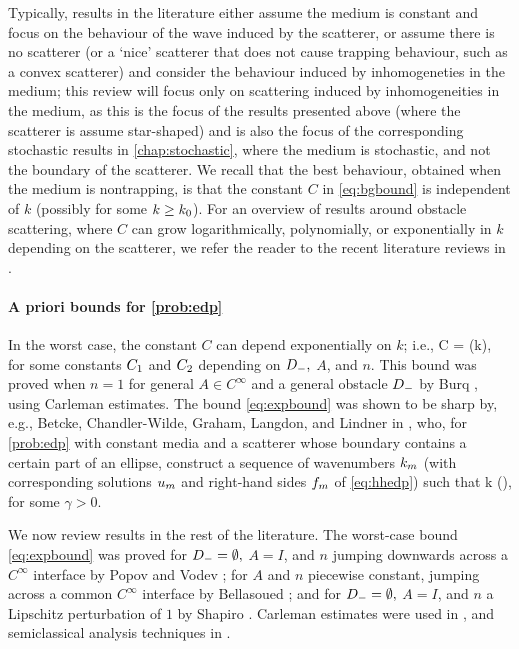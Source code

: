 Typically, results in the literature either assume the medium is constant and focus on the behaviour of the wave induced by the scatterer, or assume there is no scatterer (or a `nice' scatterer that does not cause trapping behaviour, such as a convex scatterer) and consider the behaviour induced by inhomogeneties in the medium; this review will focus only on scattering induced by inhomogeneities in the medium, as this is the focus of the results presented above (where the scatterer is assume star-shaped) and is also the focus of the corresponding stochastic results in \cref{chap:stochastic}, where the medium is stochastic, and not the boundary of the scatterer. We recall that the best behaviour, obtained when the medium is nontrapping, is that the constant $C$ in \eqref{eq:bgbound} is independent of $k$ (possibly for some $k \geq k_{0}$). For an overview of results around obstacle scattering, where $C$ can grow logarithmically, polynomially, or exponentially in $k$ depending on the scatterer, we refer the reader to the recent literature reviews in \cite[Sections 1.1 and 1.3]{ChSpGiSm:17}.

\paragraph{A priori bounds for \cref{prob:edp}} In the worst case, the constant $C$ can depend exponentially on $k$; i.e.,
\beq\label{eq:expbound}
C = \Co \exp(k\Ct),
\eeq
for some constants $C_{1}$ and $C_{2}$ depending on $D_{-}, $ $A$, and $n$. This bound was proved when $n=1$ for general $A \in C^\infty$ and a general obstacle $D_{-}$ by Burq \cite{Bu:98}, using Carleman estimates. The bound \eqref{eq:expbound} was shown to be sharp by, e.g., Betcke, Chandler-Wilde, Graham, Langdon, and Lindner in \cite[Equation 2.22]{BeChGrLaLi:11}, who, for \cref{prob:edp} with constant media and a scatterer whose boundary contains a certain part of an ellipse, construct a sequence of wavenumbers $k_{m}$ (with corresponding solutions $u_{m}$ and right-hand sides $f_{m}$ of \eqref{eq:hhedp}) such that
\beqs
k\NLtDp{\um} \gtrsim \exp\mleft(\gamma \km\mright)\NLtDp{\fm},
\eeqs
for some $\gamma > 0$.

We now review results in the rest of the literature. The worst-case bound \eqref{eq:expbound} was proved for $D_{-}=\emptyset,$ $A=I$, and $n$ jumping downwards across a $C^\infty$ interface by Popov and Vodev \cite{PoVo:99a}; for $A$ and $n$ piecewise constant, jumping across a common $C^\infty$ interface by Bellasoued \cite{Be:03}; and for $D_{-} = \emptyset,$ $A=I$, and $n$ a Lipschitz perturbation of $1$ by Shapiro \cite{Sh:18}. Carleman estimates were used in \cite{Be:03}, and semiclassical analysis techniques in \cite{PoVo:99a,Sh:18}.  

